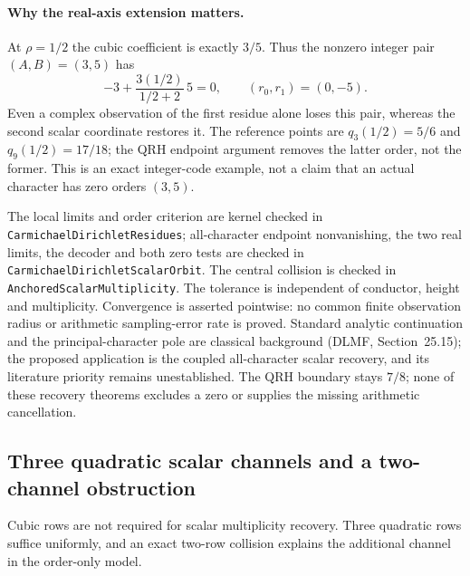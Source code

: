 \paragraph{Why the real-axis extension matters.}
At \(\rho=1/2\) the cubic coefficient is exactly \(3/5\). Thus the
nonzero integer pair \((A,B)=(3,5)\) has
\[
 -3+\frac{3(1/2)}{1/2+2}\,5=0,
 \qquad (r_0,r_1)=(0,-5).
\]
Even a complex observation of the first residue alone loses this pair,
whereas the second scalar coordinate restores it. The reference points are
\(q_3(1/2)=5/6\) and \(q_9(1/2)=17/18\); the QRH endpoint argument removes
the latter order, not the former. This is an exact integer-code example,
not a claim that an actual character has zero orders \((3,5)\).

The local limits and order criterion are kernel checked in
\texttt{CarmichaelDirichletResidues}; all-character endpoint nonvanishing,
the two real limits, the decoder and both zero tests are checked in
\texttt{CarmichaelDirichletScalarOrbit}. The central collision is checked in
\texttt{AnchoredScalarMultiplicity}. The tolerance is independent of
conductor, height and multiplicity. Convergence is asserted pointwise:
no common finite observation radius or arithmetic sampling-error rate is
proved. Standard analytic continuation and the principal-character pole
are classical background (DLMF, Section~25.15); the proposed application is
the coupled all-character scalar recovery, and its literature priority
remains unestablished. The QRH boundary stays \(7/8\); none of these recovery
theorems excludes a zero or supplies the missing arithmetic cancellation.

\subsection{Three quadratic scalar channels and a two-channel obstruction}
\label{sec:quadratic-scalar-chain}

Cubic rows are not required for scalar multiplicity recovery. Three quadratic
rows suffice uniformly, and an exact two-row collision explains the additional
channel in the order-only model.


